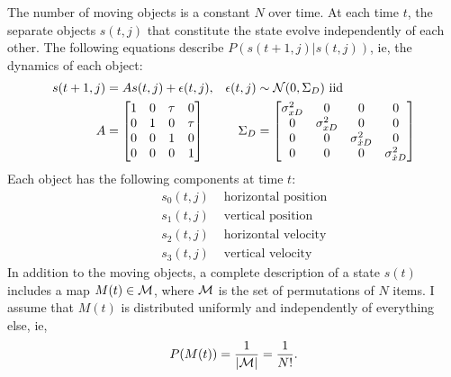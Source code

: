 \documentclass[11pt]{article}
\newcommand{\normal}[2]{{\cal N}(#1,#2)}
\newcommand{\xdot}{{\dot x}}
\newcommand{\M}{{\cal M}}
\newcommand{\ti}[2]{{#1}{(#2)}}                         %
\begin{document}
The number of moving objects is a constant $N$ over time.  At each
time $t$, the separate objects $\ti{s}{t,j}$ that constitute the state
evolve independently of each other.  The following equations describe
$P(\ti{s}{t+1,j}|\ti{s}{t,j})$, ie, the dynamics of each object:
\begin{subequations}
  \label{eq:dynamics}
  \begin{align}
    \ti{s}{t+1,j} &= A  \ti{s}{t,j} + \ti{\epsilon}{t,j}, &
    \ti{\epsilon}{t,j} &\sim \normal{0}{\Sigma_{D}} \text{ iid} \\
    A &= \begin{bmatrix}
      1 & 0 & \tau & 0 \\
      0 & 1 & 0 & \tau \\
      0 & 0 & 1 & 0 \\
      0 & 0 & 0 & 1
    \end{bmatrix} &
    \Sigma_{D} &= \begin{bmatrix}
      \sigma^2_{xD} & 0 & 0 & 0 \\
      0 & \sigma^2_{xD} & 0 & 0 \\
      0 & 0 & \sigma^2_{\xdot D} & 0 \\
      0 & 0 & 0 & \sigma^2_{\xdot D}
    \end{bmatrix}
  \end{align}
\end{subequations}
Each object has the following components at time $t$:
\begin{align*}
  &&s_{0}(t,j) & \text{ horizontal position} \\
  &&s_{1}(t,j) & \text{ vertical position} \\
  &&s_{2}(t,j) & \text{ horizontal velocity} \\
  &&s_{3}(t,j) & \text{ vertical velocity}
\end{align*}
In addition to the moving objects, a complete description of a state
$\ti{s}{t}$ includes a map $\ti{M}{t}\in \M$, where $\M$ is the set of
permutations of $N$ items.  I assume that $\ti{M}{t}$ is distributed
uniformly and independently of everything else, ie,
\begin{equation*}
  P(\ti{M}{t}) = \frac{1}{\left| \M\right|} =  \frac{1}{N!}.
\end{equation*}
\end{document}
